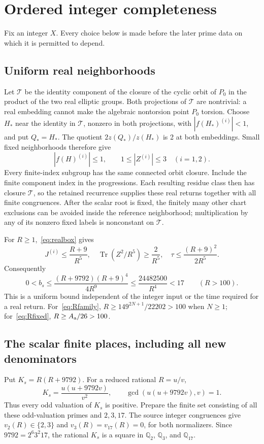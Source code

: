 \documentclass[11pt]{article}
\theoremstyle{remark}\newtheorem{remark}[theorem]{Remark}
\newcommand{\Q}{\mathbb Q}\newcommand{\Z}{\mathbb Z}
\newcommand{\Tr}{\operatorname{Tr}}\newcommand{\Nm}{\operatorname{Nm}}
\begin{document}
\section{Ordered integer completeness}
Fix an integer $X$. Every choice below is made before the later
prime data on which it is permitted to depend.

\subsection*{Uniform real neighborhoods}
Let $\mathcal T$ be the identity component of the closure of the
cyclic orbit of $P_0$ in the product of the two real elliptic groups.
Both projections of $\mathcal T$ are nontrivial: a real embedding
cannot make the algebraic nontorsion point $P_0$ torsion. Choose
$H_*$ near the identity in $\mathcal T$, nonzero in both
projections, with $|f(H_*)^{(i)}|<1$, and put $Q_*=H_*$.
The quotient $2z(Q_*)/z(H_*)$ is 2 at both embeddings.
Small fixed neighborhoods therefore give
\begin{equation}\label{eq:realbox}
       |f(H)^{(i)}|\le1,\qquad 1\le|Z^{(i)}|\le3
                         \quad(i=1,2).
\end{equation}
Every finite-index subgroup has the same connected orbit closure.
Include the finite component index in the progressions. Each
resulting residue class then has closure $\mathcal T$, so the
retained recurrence supplies these real returns together with all
finite congruences. After the scalar root is fixed, the finitely
many other chart exclusions can be avoided inside the reference
neighborhood; multiplication by any of its nonzero fixed labels
is nonconstant on $\mathcal T$.

For $R\ge1$,~\eqref{eq:realbox} gives
\[
 J^{(i)}\le\frac{R+9}{R^5},\quad
 \Tr(Z^2/R^5)\ge\frac2{R^5},\quad
 \tau\le\frac{(R+9)^2}{2R^5}.
\]
Consequently
\begin{equation}\label{eq:realbound}
 0<b_s\le\frac{(R+9792)(R+9)^4}{4R^9}
                   \le\frac{24482500}{R^4}<17\qquad(R>100).
\end{equation}
This is a uniform bound independent of the integer input or the
time required for a real return. For~\eqref{eq:Rfamily},
$R\ge149^{2N+1}/22202>100$ when $N\ge1$; for~\eqref{eq:Rfixed},
$R\ge A_{\rm a}/26>100$.

\subsection*{The scalar finite places, including all new denominators}
Put $K_s=R(R+9792)$. For a reduced rational $R=u/v$,
\[
                  K_s=\frac{u(u+9792v)}{v^2},\qquad
                  \gcd(u(u+9792v),v)=1.
\]
Thus every odd valuation of $K_s$ is positive. Prepare the finite
set consisting of all these odd-valuation primes and $2,3,17$.
The source integer congruences give
$v_2(R)\in\{2,3\}$ and $v_3(R)=v_{17}(R)=0$, for both
normalizers. Since $9792=2^6 3^2 17$, the rational $K_s$ is a
square in $\Q_2$, $\Q_3$, and $\Q_{17}$.
\end{document}
